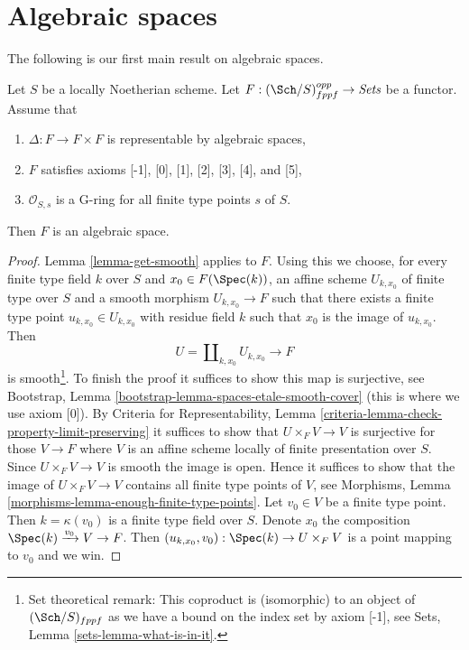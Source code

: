 \section{Algebraic spaces}
\label{section-algebraic-spaces}

\noindent
The following is our first main result on algebraic spaces.

\begin{proposition}
\label{proposition-spaces-diagonal-representable}
Let $S$ be a locally Noetherian scheme. Let
$F : (\Sch/S)_{fppf}^{opp} \to \textit{Sets}$ be a functor. Assume that
\begin{enumerate}
\item $\Delta : F \to F \times F$ is representable by algebraic spaces,
\item $F$ satisfies axioms [-1], [0], [1], [2], [3], [4], and [5],
\item $\mathcal{O}_{S, s}$ is a G-ring for all finite type points $s$ of $S$.
\end{enumerate}
Then $F$ is an algebraic space.
\end{proposition}

\begin{proof}
Lemma \ref{lemma-get-smooth} applies to $F$. Using this we
choose, for every finite type field $k$ over $S$ and $x_0 \in F(\Spec(k))$,
an affine scheme $U_{k, x_0}$ of finite type over $S$ and a smooth morphism
$U_{k, x_0} \to F$ such that there exists a finite type point
$u_{k, x_0} \in U_{k, x_0}$ with residue field $k$ such that $x_0$
is the image of $u_{k, x_0}$. Then
$$
U = \coprod\nolimits_{k, x_0} U_{k, x_0} \longrightarrow F
$$
is smooth\footnote{Set theoretical remark: This coproduct is (isomorphic)
to an object of $(\Sch/S)_{fppf}$ as we have a bound on the index set
by axiom [-1], see Sets, Lemma \ref{sets-lemma-what-is-in-it}.}.
To finish the proof it suffices to show this map is surjective,
see Bootstrap, Lemma \ref{bootstrap-lemma-spaces-etale-smooth-cover}
(this is where we use axiom [0]). By Criteria for Representability, Lemma
\ref{criteria-lemma-check-property-limit-preserving}
it suffices to show that $U \times_F V \to V$ is surjective for those
$V \to F$ where $V$ is an affine scheme locally of finite presentation
over $S$. Since $U \times_F V \to V$ is smooth the image is open. Hence
it suffices to show that the image of $U \times_F V \to V$ contains all
finite type points of $V$, see
Morphisms, Lemma \ref{morphisms-lemma-enough-finite-type-points}.
Let $v_0 \in V$ be a finite type point. Then $k = \kappa(v_0)$ is
a finite type field over $S$. Denote $x_0$ the composition
$\Spec(k) \xrightarrow{v_0} V \to F$. Then
$(u_{k, x_0}, v_0) : \Spec(k) \to U \times_F V$ is a point mapping to
$v_0$ and we win.
\end{proof}

